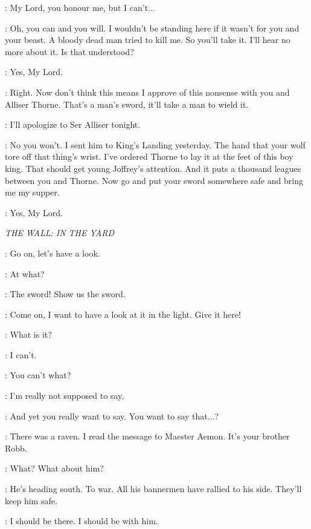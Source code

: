 \JON: My Lord, you honour me, but I can't$\ldots$  

\JEOR: Oh, you can and you will. I wouldn't be standing here if it wasn't for you and your beast. A bloody dead man tried to kill me. So you'll take it. I'll hear no more about it. Is that understood? 

\JON: Yes, My Lord. 

\JEOR: Right. Now don't think this means I approve of this nonsense with you and Alliser Thorne. That's a man's sword, it'll take a man to wield it. 

\JON: I'll apologize to Ser Alliser tonight. 

\JEOR: No you won't. I sent him to King's Landing yesterday. The hand that your wolf tore off that thing's wrist.  I've ordered Thorne to lay it at the feet of this boy king. That should get young Joffrey's attention. And it puts a thousand leagues between you and Thorne. Now go and put your sword somewhere safe and bring me my supper. 

\JON: Yes, My Lord. 


\scene

\textit{THE WALL: IN THE YARD} 


\PYP: Go on, let's have a look. 

\JON: At what? 

\GRENN: The sword! Show us the sword. 

\PYP: Come on, I want to have a look at it in the light. Give it here! 


\JON: What is it? 

\SAM: I can't. 

\JON: You can't what? 

\SAM: I'm really not supposed to say. 

\JON: And yet you really want to say. You want to say that$\ldots$? 

\SAM: There was a raven. I read the message to Maester Aemon. It's your brother Robb. 

\JON: What? What about him? 

\SAM: He's heading south. To war. All his bannermen have rallied to his side. They'll keep him safe. 

\JON: I should be there. I should be with him. 


